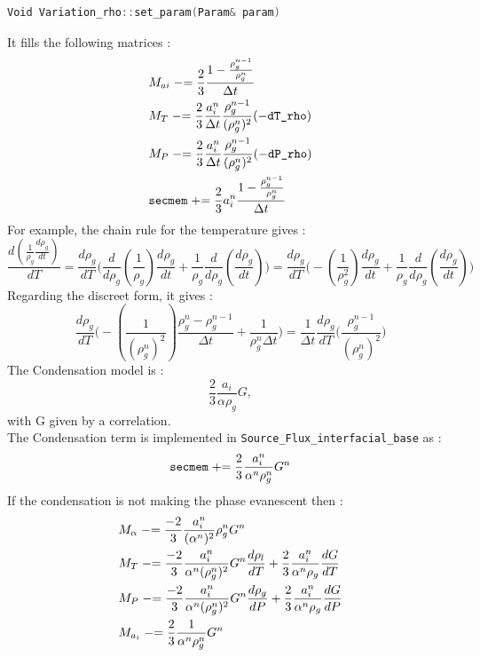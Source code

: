 \begin{lstlisting}[language=c++]
Void Variation_rho::set_param(Param& param)
\end{lstlisting}
It fills the following matrices :
\begin{align}
    &M_{ai} \mathrel{-}=  \frac{2}{3}\frac{1-\frac{\rho_g^{n-1}}{\rho_g^n}}{\Delta t}\\
    &M_{T} \mathrel{-}=  \frac{2}{3} \frac{a^n_i}{\Delta t} \frac{\rho_g^{n-1}}{(\rho_g^{n})^2}(-\texttt{dT\_rho})\\
    &M_{P} \mathrel{-}=  \frac{2}{3}\frac{a^n_i}{\Delta t} \frac{\rho_g^{n-1}}{(\rho_g^{n})^2}(-\texttt{dP\_rho})\\
    &\texttt{secmem} \mathrel{+}=  \frac{2}{3}a^n_i\frac{1-\frac{\rho_g^{n-1}}{\rho_g^n}}{\Delta t}
\end{align}
For example, the chain rule for the temperature gives :
\begin{equation}
    \frac{d(\frac{1}{\rho_g}\frac{d\rho_g}{dt})}{dT}=\frac{d\rho_g}{dT}\Bigg(\frac{d}{d\rho_g}(\frac{1}{\rho_g})\frac{d\rho_g}{dt}+\frac{1}{\rho_g}\frac{d}{d\rho_g}(\frac{d\rho_g}{dt}) \Bigg)=\frac{d\rho_g}{dT}\Bigg(-(\frac{1}{\rho_g^2})\frac{d\rho_g}{dt}+\frac{1}{\rho_g}\frac{d}{d\rho_g}(\frac{d\rho_g}{dt}) \Bigg)
\end{equation}
Regarding the discreet form, it gives :
\begin{equation}
   \frac{d\rho_g}{dT}\Bigg(-(\frac{1}{(\rho_g^n)^2})\frac{\rho_g^n-\rho_g^{n-1}}{\Delta t}+\frac{1}{\rho_g^n\Delta t}\Bigg)=\frac{1}{\Delta t}\frac{d\rho_g}{dT}\Bigg(\frac{\rho_g^{n-1}}{(\rho_g^n)^2}\Bigg)
\end{equation}
The {\colorbox{codebackground}{\color{codekeyword3} Condensation}} model is :
\begin{equation}
    \frac{2}{3}\frac{a_i}{\alpha \rho_g} G,
\end{equation}
with G given by a correlation.\\
The {\colorbox{codebackground}{\color{codekeyword3} Condensation}} term is implemented in \texttt{Source_Flux_interfacial_base} as :
\begin{equation}
    \texttt{secmem}  \mathrel{+}=  \frac{2}{3}\frac{a_i^n}{\alpha^n\rho_g^n} G^n
\end{equation}
If the condensation is not making the phase evanescent then :
\begin{align}
    &M_\alpha  \mathrel{-}=  \frac{-2}{3}\frac{a_i^n}{(\alpha^n)^2}\rho_g^n G^n\\
    &M_T  \mathrel{-}=  \frac{-2}{3}\frac{a_i^n}{\alpha^n(\rho_g^n)^2} G^n \frac{d\rho_l}{dT}+\frac{2}{3}\frac{a_i^n}{\alpha^n\rho_g} \frac{dG}{dT}\\
    &M_P  \mathrel{-}=  \frac{-2}{3}\frac{a_i^n}{\alpha^n(\rho_g^n)^2} G^n \frac{d\rho_g}{dP}+\frac{2}{3}\frac{a_i^n}{\alpha^n\rho_g} \frac{dG}{dP}\\
    &M_{a_i}  \mathrel{-}=  \frac{2}{3}\frac{1}{\alpha^n\rho_g^n} G^n
\end{align}


